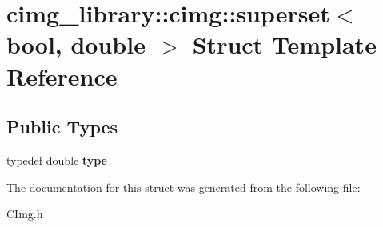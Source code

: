 \hypertarget{structcimg__library_1_1cimg_1_1superset_3_01bool_00_01double_01_4}{\section{cimg\-\_\-library\-:\-:cimg\-:\-:superset$<$ bool, double $>$ Struct Template Reference}
\label{structcimg__library_1_1cimg_1_1superset_3_01bool_00_01double_01_4}
}
\subsection*{Public Types}
\begin{DoxyCompactItemize}
\item 
\hypertarget{structcimg__library_1_1cimg_1_1superset_3_01bool_00_01double_01_4_ac79773aadbd42a74dc0a14d716fa0665}{typedef double {\bfseries type}}\label{structcimg__library_1_1cimg_1_1superset_3_01bool_00_01double_01_4_ac79773aadbd42a74dc0a14d716fa0665}

\end{DoxyCompactItemize}


The documentation for this struct was generated from the following file\-:\begin{DoxyCompactItemize}
\item 
C\-Img.\-h\end{DoxyCompactItemize}
